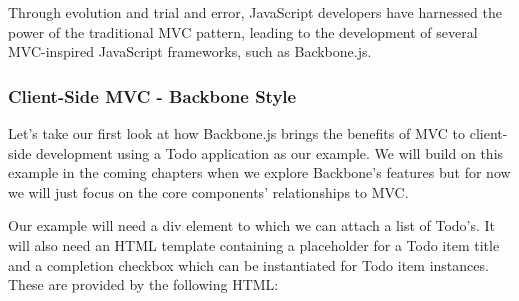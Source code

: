\documentclass[9pt]{book}
\newenvironment{Shaded}{}{}
\newcommand{\KeywordTok}[1]{\textcolor[rgb]{0.00,0.44,0.13}{\textbf{{#1}}}}
\newcommand{\StringTok}[1]{\textcolor[rgb]{0.25,0.44,0.63}{{#1}}}
\newcommand{\OtherTok}[1]{\textcolor[rgb]{0.00,0.44,0.13}{{#1}}}
\newcommand{\ErrorTok}[1]{\textcolor[rgb]{1.00,0.00,0.00}{\textbf{{#1}}}}
\newcommand{\NormalTok}[1]{{#1}}
\begin{document}
Through evolution and trial and error, JavaScript developers have
harnessed the power of the traditional MVC pattern, leading to the
development of several MVC-inspired JavaScript frameworks, such as
Backbone.js.

\subsubsection{Client-Side MVC - Backbone
Style}\label{client-side-mvc---backbone-style}

Let's take our first look at how Backbone.js brings the benefits of MVC
to client-side development using a Todo application as our example. We
will build on this example in the coming chapters when we explore
Backbone's features but for now we will just focus on the core
components' relationships to MVC.

Our example will need a div element to which we can attach a list of
Todo's. It will also need an HTML template containing a placeholder for
a Todo item title and a completion checkbox which can be instantiated
for Todo item instances. These are provided by the following HTML:

\begin{Shaded}
\end{Shaded}
\end{document}
